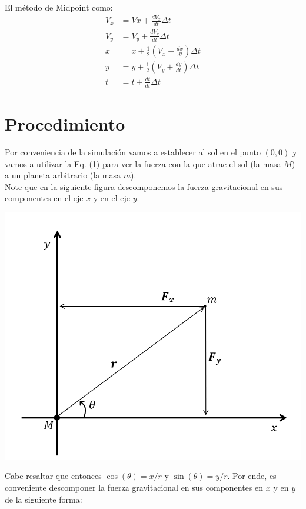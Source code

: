 \documentclass[twoside]{article}
\newenvironment{Figure}
{\par\medskip\noindent\minipage{\linewidth}}
{\endminipage\par\medskip}
\begin{document}
\begin{multicols}{2}
	El método de Midpoint como:
	\begin{align*}
		V_{x} & = Vx + \frac{dV_{x}} {dt} \Delta t \\
		V_{y} & = V_{y} + \frac{d V_{y}}{dt} \Delta t \\
		x & = x + \frac{1}{2}(V_{x} + \frac{dx}{dt})\Delta t \\
		y & = y + \frac{1}{2}(V_{y} + \frac{dy}{dt})\Delta t\\
		t & = t + \frac {dt } {dt } \Delta t 
	\end{align*}
	
	\section{Procedimiento}
	Por conveniencia de la simulación vamos a establecer al sol en el punto $ (0,0) $ y vamos a utilizar la Eq. (1) para ver la fuerza con la que atrae el sol (la masa $ M $) a un planeta arbitrario (la masa $ m $).\\
	
	Note que en la siguiente figura descomponemos la fuerza gravitacional en sus componentes en el eje $ x $ y en el eje $ y $. 
	\begin{Figure}
		\centering
		\includegraphics[width=\linewidth]{descomposicion_fuerzas.png}
	\end{Figure}
	Cabe resaltar que entonces $ \cos (\theta) = x / r $ y $ \sin (\theta) = y / r $. Por ende, es conveniente descomponer la fuerza gravitacional en sus componentes en $ x $ y en $ y $ de la siguiente forma:
	
\end{multicols}
	
\end{document}
